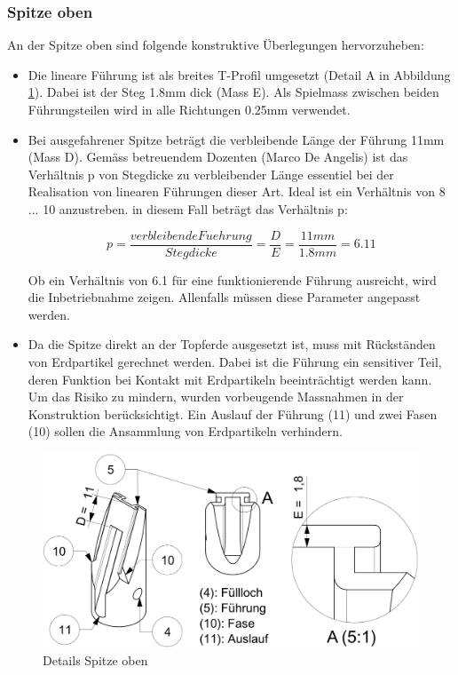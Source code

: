 \subsubsection{Spitze oben}
An der Spitze oben sind folgende konstruktive Überlegungen hervorzuheben:
\begin{itemize}
	\item Die lineare Führung ist als breites T-Profil umgesetzt (Detail A in Abbildung \ref{fig:details_spitze_oben}). Dabei ist der Steg 1.8mm dick (Mass E). Als Spielmass zwischen beiden Führungsteilen wird in alle Richtungen 0.25mm verwendet.
	
	\item Bei ausgefahrener Spitze beträgt die verbleibende Länge der Führung 11mm (Mass D). Gemäss betreuendem Dozenten (Marco De Angelis) ist das Verhältnis p von Stegdicke zu verbleibender Länge essentiel bei der Realisation von linearen Führungen dieser Art. Ideal ist ein Verhältnis von 8 ... 10 anzustreben. in diesem Fall beträgt das Verhältnis p:
	
	\begin{equation}
	p=\frac{verbleibende Fuehrung}{Stegdicke}=\frac{D}{E}=\frac{11mm}{1.8mm}=6.11
	\end{equation}
		
	Ob ein Verhältnis von 6.1 für eine funktionierende Führung ausreicht, wird die Inbetriebnahme zeigen. Allenfalls müssen diese Parameter angepasst werden.
	
	\item Da die Spitze direkt an der Topferde ausgesetzt ist, muss mit Rückständen von Erdpartikel gerechnet werden. Dabei ist die Führung ein sensitiver Teil, deren Funktion bei Kontakt mit Erdpartikeln beeinträchtigt werden kann. Um das Risiko zu mindern, wurden vorbeugende Massnahmen in der Konstruktion berücksichtigt. Ein Auslauf der Führung (11) und zwei Fasen (10) sollen die Ansammlung von Erdpartikeln verhindern.
	\end{itemize}
	\begin{figure}[H]
	\includegraphics[scale=1.0]{Illustrationen/6-Umsetzung/details_spitze_oben.jpg}
	\caption{Details Spitze oben}
	\label{fig:details_spitze_oben}
	\end{figure}

